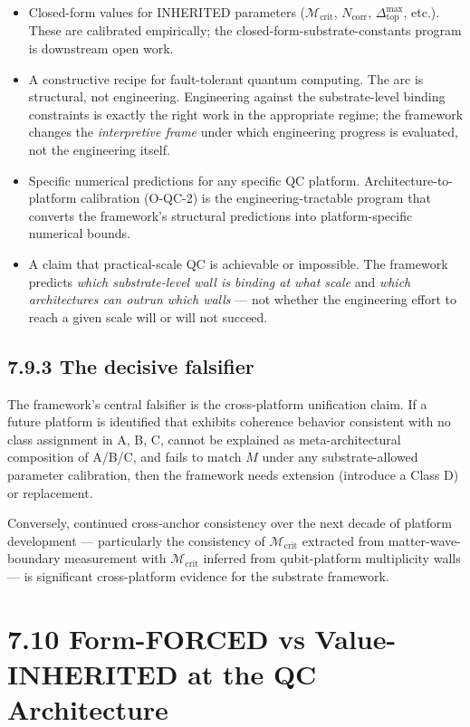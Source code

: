 \documentclass[11pt]{book}
\begin{document}
\begin{itemize}
\item Closed-form values for INHERITED parameters ($\mathcal{M}_\mathrm{crit}$, $N_\mathrm{corr}$, $\Delta_\mathrm{top}^{\max}$, etc.). These are calibrated empirically; the closed-form-substrate-constants program is downstream open work.
\item A constructive recipe for fault-tolerant quantum computing. The arc is structural, not engineering. Engineering against the substrate-level binding constraints is exactly the right work in the appropriate regime; the framework changes the \textit{interpretive frame} under which engineering progress is evaluated, not the engineering itself.
\item Specific numerical predictions for any specific QC platform. Architecture-to-platform calibration (O-QC-2) is the engineering-tractable program that converts the framework's structural predictions into platform-specific numerical bounds.
\item A claim that practical-scale QC is achievable or impossible. The framework predicts \textit{which substrate-level wall is binding at what scale} and \textit{which architectures can outrun which walls} — not whether the engineering effort to reach a given scale will or will not succeed.
\end{itemize}

\subsection{7.9.3 The decisive falsifier}

The framework's central falsifier is the cross-platform unification claim. If a future platform is identified that exhibits coherence behavior consistent with no class assignment in {A, B, C}, cannot be explained as meta-architectural composition of A/B/C, and fails to match $M$ under any substrate-allowed parameter calibration, then the framework needs extension (introduce a Class D) or replacement.

Conversely, continued cross-anchor consistency over the next decade of platform development — particularly the consistency of $\mathcal{M}_\mathrm{crit}$ extracted from matter-wave-boundary measurement with $\mathcal{M}_\mathrm{crit}$ inferred from qubit-platform multiplicity walls — is significant cross-platform evidence for the substrate framework.

\section{7.10 Form-FORCED vs Value-INHERITED at the QC Architecture}
\end{document}
